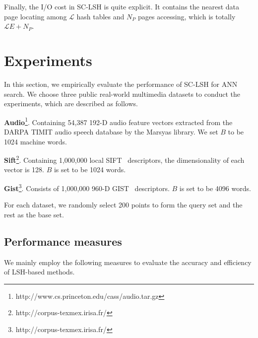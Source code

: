 \documentclass[twocolumn]{svjour3}          %
\begin{document}
Finally, the I/O cost in SC-LSH is quite explicit. It contains the nearest data page locating among $\mathcal{L}$ hash tables and $N_P$ pages accessing, which is totally $\mathcal{L}E+N_P$.






\section{Experiments}\label{sec:er}
In this section, we empirically evaluate the performance of SC-LSH for ANN search. We choose three public real-world multimedia datasets to conduct the experiments, which are described as follows.

\textbf{Audio}\footnote{http://www.cs.princeton.edu/cass/audio.tar.gz}. Containing 54,387 192-D audio feature vectors extracted from the DARPA TIMIT audio speech database by the Marsyas library. We set $B$ to be 1024 machine words.

\textbf{Sift}\footnote{http://corpus-texmex.irisa.fr/}. Containing 1,000,000 local SIFT~\cite{Lowe2004Distinctive} descriptors, the dimensionality of each vector is 128. $B$ is set to be 1024 words.

\textbf{Gist}\footnote{http://corpus-texmex.irisa.fr/}. Consists of 1,000,000 960-D GIST~\cite{Oliva2001Modeling} descriptors. $B$ is set to be 4096 words.

For each dataset, we randomly select 200 points  to form the query set and the rest as the base set.

\subsection{Performance measures}
We mainly employ the following measures to evaluate the accuracy and efficiency of LSH-based methods.
\end{document}
